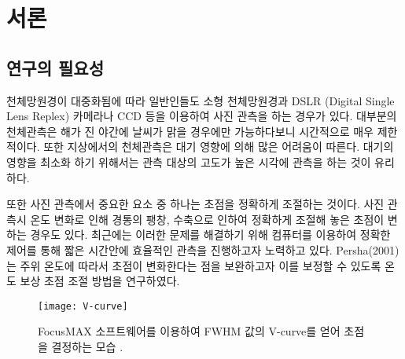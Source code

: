 

\section{서론}
\subsection{연구의 필요성}

천체망원경이 대중화됨에 따라 일반인들도 소형 천체망원경과 DSLR (Digital Single Lens Replex) 카메라나 CCD 등을 이용하여 사진 관측을 하는 경우가 있다. 대부분의 천체관측은 해가 진 야간에 날씨가 맑을 경우에만 가능하다보니 시간적으로 매우 제한적이다. 또한 지상에서의 천체관측은 대기 영향에 의해 많은 어려움이 따른다. 대기의 영향을 최소화 하기 위해서는 관측 대상의 고도가 높은 시각에 관측을 하는 것이 유리하다. 

또한 사진 관측에서 중요한 요소 중 하나는 초점을 정확하게 조절하는 것이다. 사진 관측시 온도 변화로 인해 경통의 팽창, 수축으로 인하여 정확하게 조절해 놓은 초점이 변하는 경우도 있다. 최근에는 이러한 문제를 해결하기 위해 컴퓨터를 이용하여 정확한 제어를 통해 짧은 시간안에 효율적인 관측을 진행하고자 노력하고 있다. Persha(2001)는 주위 온도에 따라서 초점이 변화한다는 점을 보완하고자 이를 보정할 수 있도록 온도 보상 초점 조절 방법을 연구하였다.\cite{persha2001temperature} 



\begin{figure}[h]
	\begin{center}
		\texttt{[image: V-curve]}
	\end{center}
	\caption{FocusMAX 소프트웨어를 이용하여 FWHM 값의 V-curve를 얻어 초점을 결정하는 모습 \cite{weber2001fast}.}
	\label{V-curve}
\end{figure}

